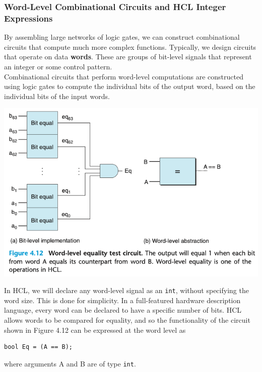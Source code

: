 \documentclass[11pt]{article}
\begin{document}
\subsubsection{Word-Level Combinational Circuits and HCL Integer Expressions}
\label{sec:orga712a62}
By assembling large networks of logic gates, we can construct combinational circuits that compute much more complex functions. Typically, we design circuits that operate on data \textbf{words}. These are groups of bit-level signals that represent an integer or some control pattern.\\

Combinational circuits that perform word-level computations are constructed using logic gates to compute the individual bits of the output word, based on the individual bits of the input words.\\

\begin{center}
\includegraphics[width=.9\linewidth]{pics/figure4.12-word-level-equality-test-circuit.png}
\end{center}

In HCL, we will declare any word-level signal as an \texttt{int}, without specifying the word size. This is done for simplicity. In a full-featured hardware description language, every word can be declared to have a specific number of bits. HCL allows words to be compared for equality, and so the functionality of the circuit shown in Figure 4.12 can be expressed at the word level as\\
\begin{verbatim}
bool Eq = (A == B);
\end{verbatim}
where arguments A and B are of type \texttt{int}.\\
\end{document}
